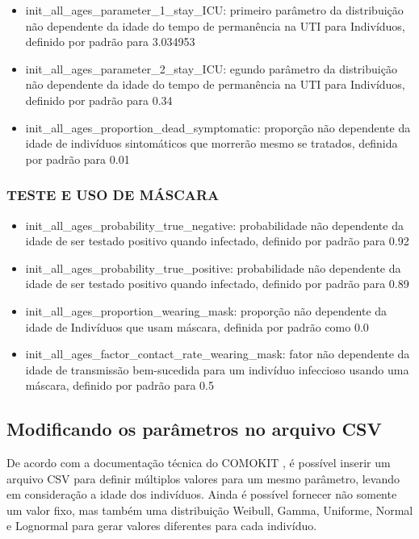 \begin{itemize}
\item {init\_all\_ages\_parameter\_1\_stay\_ICU}: primeiro parâmetro da distribuição não dependente da idade do tempo de permanência na UTI para Indivíduos, definido por padrão para 3.034953
\item {init\_all\_ages\_parameter\_2\_stay\_ICU}: egundo parâmetro da distribuição não dependente da idade do tempo de permanência na UTI para Indivíduos, definido por padrão para 0.34
\item {init\_all\_ages\_proportion\_dead\_symptomatic}: proporção não dependente da idade de indivíduos sintomáticos que morrerão mesmo se tratados, definida por padrão para 0.01
\end{itemize}

\subsubsection{TESTE E USO DE MÁSCARA}

\begin{itemize}
\item {init\_all\_ages\_probability\_true\_negative}: probabilidade não dependente da idade de ser testado positivo quando infectado, definido por padrão para 0.92
\item {init\_all\_ages\_probability\_true\_positive}: probabilidade não dependente da idade de ser testado positivo quando infectado, definido por padrão para 0.89
\item {init\_all\_ages\_proportion\_wearing\_mask}: proporção não dependente da idade de Indivíduos que usam máscara, definida por padrão como 0.0
\item {init\_all\_ages\_factor\_contact\_rate\_wearing\_mask}: fator não dependente da idade de transmissão bem-sucedida para um indivíduo infeccioso usando uma máscara, definido por padrão para 0.5
\end{itemize}

\subsection{Modificando os parâmetros no arquivo CSV}

De acordo com a documentação técnica do COMOKIT \cite{ComokitDoc}, é possível inserir um arquivo CSV para definir múltiplos valores para um mesmo parâmetro, levando em consideração a idade dos indivíduos. Ainda é possível fornecer não somente um valor fixo, mas também uma distribuição Weibull, Gamma, Uniforme, Normal e Lognormal para gerar valores diferentes para cada indivíduo.

